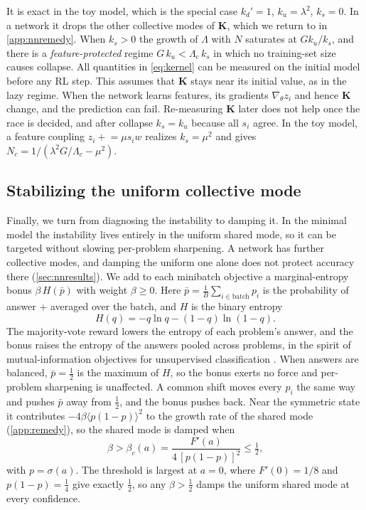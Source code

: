 It is exact in the toy model, which is the special case $k_d'=1$, $k_u=\lambda^2$, $k_s=0$. In a network it drops the other collective modes of $\mathbf K$, which we return to in \cref{app:nnremedy}.
When $k_s>0$ the growth of $\Lambda$ with $N$ saturates at $Gk_u/k_s$, and there is a \emph{feature-protected} regime $G\,k_u<\Lambda_c\,k_s$ in which no training-set size causes collapse.
All quantities in \cref{eq:kernel} can be measured on the initial model before any RL step.
This assumes that $\mathbf K$ stays near its initial value, as in the lazy regime. When the network learns features, its gradients $\nabla_\theta z_i$ and hence $\mathbf K$ change, and the prediction can fail. Re-measuring $\mathbf K$ later does not help once the race is decided, and after collapse $k_s=k_u$ because all $s_i$ agree.
In the toy model, a feature coupling $z_i\mathrel{+}=\mu s_iw$ realizes $k_s=\mu^2$ and gives $N_c=1/(\lambda^2G/\Lambda_c-\mu^2)$.

\subsection{Stabilizing the uniform collective mode}
\label{sec:remedy}
Finally, we turn from diagnosing the instability to damping it.
In the minimal model the instability lives entirely in the uniform shared mode, so it can be targeted without slowing per-problem sharpening. A network has further collective modes, and damping the uniform one alone does not protect accuracy there (\cref{sec:nnresults}).
We add to each minibatch objective a marginal-entropy bonus $\beta\,H(\bar p)$ with weight $\beta\ge0$. Here $\bar p=\frac1B\sum_{i\in\text{batch}}p_i$ is the probability of answer $+$ averaged over the batch, and $H$ is the binary entropy
\begin{equation*}
  H(q)=-q\ln q-(1-q)\ln(1-q).
\end{equation*}
The majority-vote reward lowers the entropy of each problem's answer, and the bonus raises the entropy of the answers pooled across problems, in the spirit of mutual-information objectives for unsupervised classification \citep{bridle1991phantom,gomes2010rim}.
When answers are balanced, $\bar p=\tfrac12$ is the maximum of $H$, so the bonus exerts no force and per-problem sharpening is unaffected.
A common shift moves every $p_i$ the same way and pushes $\bar p$ away from $\tfrac12$, and the bonus pushes back.
Near the symmetric state it contributes $-4\beta\langle p(1-p)\rangle^2$ to the growth rate of the shared mode (\cref{app:remedy}), so the shared mode is damped when
\begin{equation}
  \beta>\beta_c(a)=\frac{F'(a)}{4\,[p(1-p)]^2}\le\tfrac12 ,
  \label{eq:beta}
\end{equation}
with $p=\sigma(a)$. The threshold is largest at $a=0$, where $F'(0)=1/8$ and $p(1-p)=\tfrac14$ give exactly $\tfrac12$, so any $\beta>\tfrac12$ damps the uniform shared mode at every confidence.
